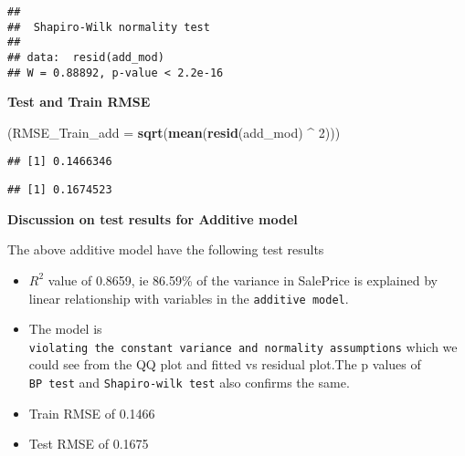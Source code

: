 \documentclass[]{article}
\newenvironment{Shaded}{\begin{snugshade}}{\end{snugshade}}
\newcommand{\KeywordTok}[1]{\textcolor[rgb]{0.13,0.29,0.53}{\textbf{#1}}}
\newcommand{\DataTypeTok}[1]{\textcolor[rgb]{0.13,0.29,0.53}{#1}}
\newcommand{\DecValTok}[1]{\textcolor[rgb]{0.00,0.00,0.81}{#1}}
\newcommand{\StringTok}[1]{\textcolor[rgb]{0.31,0.60,0.02}{#1}}
\newcommand{\OperatorTok}[1]{\textcolor[rgb]{0.81,0.36,0.00}{\textbf{#1}}}
\newcommand{\NormalTok}[1]{#1}
\begin{document}
\begin{verbatim}
## 
##  Shapiro-Wilk normality test
## 
## data:  resid(add_mod)
## W = 0.88892, p-value < 2.2e-16
\end{verbatim}

\textbf{Test and Train RMSE}

\begin{Shaded}
\begin{Highlighting}[]
\NormalTok{ (}\DataTypeTok{RMSE_Train_add =} \KeywordTok{sqrt}\NormalTok{(}\KeywordTok{mean}\NormalTok{(}\KeywordTok{resid}\NormalTok{(add_mod) }\OperatorTok{^}\StringTok{ }\DecValTok{2}\NormalTok{)))}
\end{Highlighting}
\end{Shaded}

\begin{verbatim}
## [1] 0.1466346
\end{verbatim}

\begin{Shaded}
\end{Shaded}

\begin{verbatim}
## [1] 0.1674523
\end{verbatim}

\textbf{Discussion on test results for Additive model}

The above additive model have the following test results

\begin{itemize}
\item
  \(R^2\) value of 0.8659, ie 86.59\% of the variance in SalePrice is
  explained by linear relationship with variables in the
  \texttt{additive\ model}.
\item
  The model is
  \texttt{violating\ the\ constant\ variance\ and\ normality\ assumptions}
  which we could see from the QQ plot and fitted vs residual plot.The p
  values of \texttt{BP\ test} and \texttt{Shapiro-wilk\ test} also
  confirms the same.
\item
  Train RMSE of 0.1466
\item
  Test RMSE of 0.1675
\end{itemize}
\end{document}
